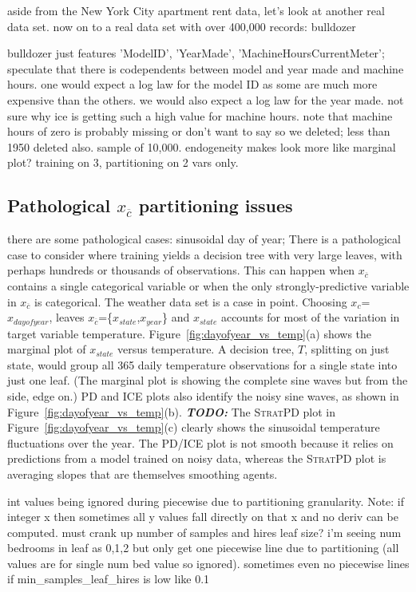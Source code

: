 \documentclass[12pt]{article}
\newcommand{\figref}[1]{Figure~\ref{#1}}
\newcommand{\todo}[1]{{\bf\em TODO:} {{\color{red}{#1}}}}
\newcommand{\spd}{\fontfamily{cmr}\textsc{\small StratPD}}
\newcommand{\xnc}{$x_{\overline{c}}$}
\begin{document}
aside from the New York City apartment rent data, let's look at another real data set. now on to a real data set with over 400,000 records: bulldozer

bulldozer  just features 'ModelID', 'YearMade', 'MachineHoursCurrentMeter'; speculate that there is codependents between model and year made and machine hours. one would expect a log law for the model ID as some are much more expensive than the others. we would also expect a log law for the year made. not sure why ice is getting such a high value for machine hours.  note that machine hours of zero is probably missing or don't want to say so we deleted; less than 1950 deleted also.  sample of 10,000. endogeneity makes look more like marginal plot? training on 3, partitioning on 2 vars only.

\subsection{Pathological \xnc{} partitioning issues}

there are some pathological cases: sinusoidal day of year; There is a pathological case to consider where training yields a decision tree with very large leaves, with perhaps hundreds or thousands of observations.  This can happen when \xnc{} contains a single categorical variable or when the only strongly-predictive variable in \xnc{} is categorical.  The weather data set is a case in point. Choosing $x_c$=$x_{dayofyear}$, leaves \xnc{}=\{$x_{state}$,$x_{year}$\} and $x_{state}$ accounts for most of the variation in target variable temperature.  \figref{fig:dayofyear_vs_temp}(a) shows the marginal plot of $x_{state}$ versus temperature. A decision tree, $T$, splitting on just state, would group all 365 daily temperature observations for a single state into just one leaf. (The marginal plot is showing the complete sine waves but from the side, edge on.)   PD and ICE plots also identify the noisy sine waves, as shown in \figref{fig:dayofyear_vs_temp}(b). \todo{uses random forest with how many trees for pd/ice?} The \spd{} plot in \figref{fig:dayofyear_vs_temp}(c) clearly shows the sinusoidal temperature fluctuations over the year. The PD/ICE plot is not smooth because it relies on predictions from a model trained on noisy data, whereas the \spd{} plot is averaging slopes that are themselves smoothing agents.


int values being ignored during piecewise due to partitioning granularity. Note: if integer x then sometimes all y values fall directly on that x and no deriv can be computed.  must crank up number of samples and hires leaf size? i'm seeing num bedrooms in leaf as 0,1,2 but only get one piecewise line due to partitioning (all values are for single num bed value so ignored). sometimes even no piecewise lines if min\_samples\_leaf\_hires is low like 0.1
\end{document}
